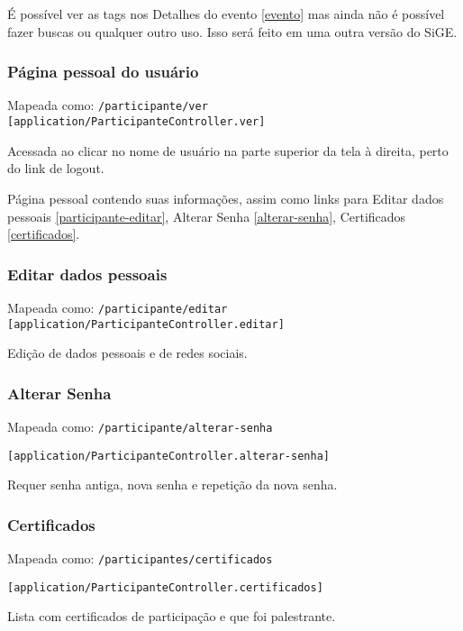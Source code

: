 É possível ver as tags nos Detalhes do evento \ref{evento} mas ainda não
é possível fazer buscas ou qualquer outro uso. Isso será feito em uma
outra versão do SiGE.

\subsubsection{Página pessoal do usuário \label{pagina-pessoal}}

Mapeada como:
\texttt{/participante/ver {[}application/ParticipanteController.ver{]}}

Acessada ao clicar no nome de usuário na parte superior da tela à
direita, perto do link de logout.

Página pessoal contendo suas informações, assim como links para Editar
dados pessoais \ref{participante-editar}, Alterar Senha
\ref{alterar-senha}, Certificados \ref{certificados}.

\subsubsection{Editar dados pessoais \label{participante-editar}}

Mapeada como:
\texttt{/participante/editar {[}application/ParticipanteController.editar{]}}

Edição de dados pessoais e de redes sociais.

\subsubsection{Alterar Senha \label{alterar-senha}}

Mapeada como: \texttt{/participante/alterar-senha}

\texttt{{[}application/ParticipanteController.alterar-senha{]}}

Requer senha antiga, nova senha e repetição da nova senha.

\subsubsection{Certificados \label{certificados}}

Mapeada como: \texttt{/participantes/certificados}

\texttt{{[}application/ParticipanteController.certificados{]}}

Lista com certificados de participação e que foi palestrante.
